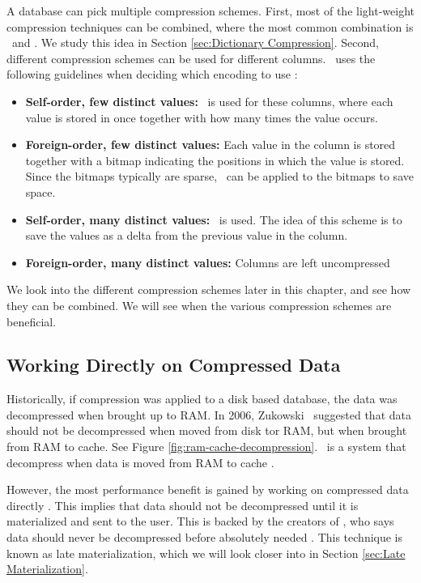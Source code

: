 A database can pick multiple compression schemes. First, most of the light-weight compression techniques can be combined, where the most common combination is \de~and \bp. We study this idea in Section \ref{sec:Dictionary Compression}. Second, different compression schemes can be used for different columns. \cstore~uses the following guidelines when deciding which encoding to use \cite{Stonebraker2005-qz}:
\begin{itemize}
  \item \textbf{Self-order, few distinct values:} \rle~is used for these columns, where each value is stored in once together with how many times the value occurs.
  \item \textbf{Foreign-order, few distinct values:} Each value in the column is stored together with a bitmap indicating the positions in which the value is stored. Since the bitmaps typically are sparse, \rle~can be applied to the bitmaps to save space.
  \item \textbf{Self-order, many distinct values:} \dele~is used. The idea of this scheme is to save the values as a delta from the previous value in the column.
  \item \textbf{Foreign-order, many distinct values:} Columns are left uncompressed
\end{itemize}

We look into the different compression schemes later in this chapter, and see how they can be combined. We will see when the various compression schemes are beneficial.

\subsection{Working Directly on Compressed Data}
\label{sub:Working Directly on Compressed Data}
Historically, if compression was applied to a disk based database, the data was decompressed when brought up to RAM. In 2006, Zukowski \ea~suggested that data should not be decompressed when moved from disk tor RAM, but when brought from RAM to cache. See Figure \ref{fig:ram-cache-decompression}. \monetx~is a system that decompress when data is moved from RAM to cache \cite{Johnson2008-cp}.

However, the most performance benefit is gained by working on compressed data directly \cite{Lemke2010-is}. This implies that data should not be decompressed until it is materialized and sent to the user. This is backed by the creators of \blink, who says data should never be decompressed before absolutely needed \cite{Barber2012-xt}. This technique is known as late materialization, which we will look closer into in Section \ref{sec:Late Materialization}.


